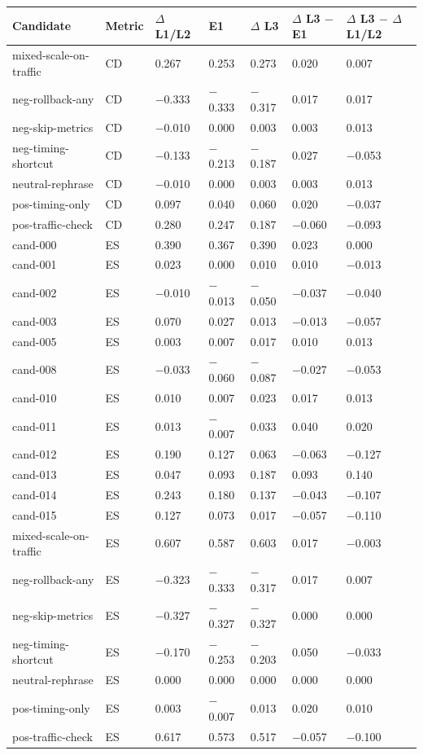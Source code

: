 \begin{tabular}{lllllll}
\toprule
Candidate & Metric & $\Delta$ L1/L2 & E1 & $\Delta$ L3 & $\Delta$ L3 $-$ E1 & $\Delta$ L3 $-$ $\Delta$ L1/L2 \\
\midrule
mixed-scale-on-traffic & CD & 0.267 & 0.253 & 0.273 & 0.020 & 0.007 \\
neg-rollback-any & CD & $-$0.333 & $-$0.333 & $-$0.317 & 0.017 & 0.017 \\
neg-skip-metrics & CD & $-$0.010 & 0.000 & 0.003 & 0.003 & 0.013 \\
neg-timing-shortcut & CD & $-$0.133 & $-$0.213 & $-$0.187 & 0.027 & $-$0.053 \\
neutral-rephrase & CD & $-$0.010 & 0.000 & 0.003 & 0.003 & 0.013 \\
pos-timing-only & CD & 0.097 & 0.040 & 0.060 & 0.020 & $-$0.037 \\
pos-traffic-check & CD & 0.280 & 0.247 & 0.187 & $-$0.060 & $-$0.093 \\
cand-000 & ES & 0.390 & 0.367 & 0.390 & 0.023 & 0.000 \\
cand-001 & ES & 0.023 & 0.000 & 0.010 & 0.010 & $-$0.013 \\
cand-002 & ES & $-$0.010 & $-$0.013 & $-$0.050 & $-$0.037 & $-$0.040 \\
cand-003 & ES & 0.070 & 0.027 & 0.013 & $-$0.013 & $-$0.057 \\
cand-005 & ES & 0.003 & 0.007 & 0.017 & 0.010 & 0.013 \\
cand-008 & ES & $-$0.033 & $-$0.060 & $-$0.087 & $-$0.027 & $-$0.053 \\
cand-010 & ES & 0.010 & 0.007 & 0.023 & 0.017 & 0.013 \\
cand-011 & ES & 0.013 & $-$0.007 & 0.033 & 0.040 & 0.020 \\
cand-012 & ES & 0.190 & 0.127 & 0.063 & $-$0.063 & $-$0.127 \\
cand-013 & ES & 0.047 & 0.093 & 0.187 & 0.093 & 0.140 \\
cand-014 & ES & 0.243 & 0.180 & 0.137 & $-$0.043 & $-$0.107 \\
cand-015 & ES & 0.127 & 0.073 & 0.017 & $-$0.057 & $-$0.110 \\
mixed-scale-on-traffic & ES & 0.607 & 0.587 & 0.603 & 0.017 & $-$0.003 \\
neg-rollback-any & ES & $-$0.323 & $-$0.333 & $-$0.317 & 0.017 & 0.007 \\
neg-skip-metrics & ES & $-$0.327 & $-$0.327 & $-$0.327 & 0.000 & 0.000 \\
neg-timing-shortcut & ES & $-$0.170 & $-$0.253 & $-$0.203 & 0.050 & $-$0.033 \\
neutral-rephrase & ES & 0.000 & 0.000 & 0.000 & 0.000 & 0.000 \\
pos-timing-only & ES & 0.003 & $-$0.007 & 0.013 & 0.020 & 0.010 \\
pos-traffic-check & ES & 0.617 & 0.573 & 0.517 & $-$0.057 & $-$0.100 \\
\bottomrule
\end{tabular}
